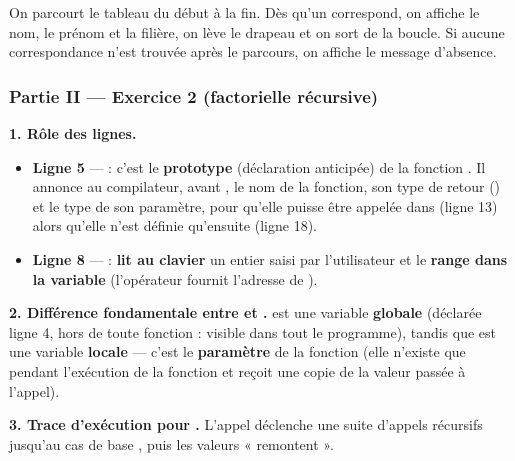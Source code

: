 \begin{remarque}
On parcourt le tableau du début à la fin. Dès qu'un  correspond, on affiche
le nom, le prénom et la filière, on lève le drapeau  et on sort de la boucle. Si
aucune correspondance n'est trouvée après le parcours, on affiche le message d'absence.
\end{remarque}

\subsubsection*{Partie II — Exercice 2 (factorielle récursive)}

\textbf{1. Rôle des lignes.}
\begin{itemize}
  \item \textbf{Ligne 5} —  : c'est le
  \textbf{prototype} (déclaration anticipée) de la fonction . Il annonce au
  compilateur, avant , le nom de la fonction, son type de retour
  () et le type de son paramètre, pour qu'elle puisse être appelée dans
   (ligne 13) alors qu'elle n'est définie qu'ensuite (ligne 18).
  \item \textbf{Ligne 8} —  : \textbf{lit au clavier} un entier
  saisi par l'utilisateur et le \textbf{range dans la variable } (l'opérateur
  \code{\&} fournit l'adresse de ).
\end{itemize}

\medskip
\textbf{2. Différence fondamentale entre  et .}  est une variable
\textbf{globale} (déclarée ligne 4, hors de toute fonction : visible dans tout le programme),
tandis que  est une variable \textbf{locale} — c'est le \textbf{paramètre} de la
fonction  (elle n'existe que pendant l'exécution de la fonction et reçoit
une copie de la valeur passée à l'appel).

\medskip
\textbf{3. Trace d'exécution pour .} L'appel  déclenche une
suite d'appels récursifs jusqu'au cas de base , puis les valeurs « remontent ».


